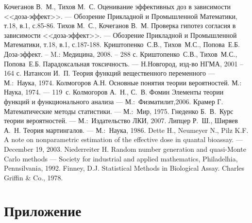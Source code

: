 \documentclass[a4paper,14pt,russian]{article}
\begin{document}
\begin{thebibliography}{99}
  Кочеганов В.~М., Тихов М.~С. Оценивание эффективных доз в зависимости <<доза-эффект>>. --- Обозрение Прикладной и Промышленной Математики, т.18, в.1, с.85-86.
  Тихов М.~С., Кочеганов В.~М. Проверка гипотез согласия в зависимости <<доза-эффект>>. ---  Обозрение Прикладной и Промышленной Математики, т.18, в.1, с.187-188.
 Криштопенко~С.В., Тихов~М.С., Попова~Е.Б. Доза-эффект.
-- M.: Медицина, 2008. -- 288 с.
 Криштопенко~С.В., Тихов~М.С., Попова~Е.Б. Парадоксальная токсичность. –-- Н.Новгород, изд-во НГМА, 2001 – 164 с.
 Натансон И.~П. Теория функций вещественного переменного --- М.:~Наука, 1974.
 Колмогоров А.Н. Основные понятия теории
  вероятностей. М.: Наука, 1974. --- 119~с.
 Колмогоров А.~Н., С.~В. Фомин Элементы теории функций и функционального анализа --- М.:~Физматилит,2006.
 Крамер Г. Математические методы статистики. --- М.:~Мир, 1975.
 Гнеденко Б.~В.\ Курс теории вероятностей. --- М.:~Издательство ЛКИ, 2007.
 Липцер Р.~Ш., Ширяев А.~Н. Теория мартингалов. --- М.:~Наука, 1986.
 Dette H., Neumeyer N., Pilz K.F. A note on nonparametric estimation of the effective dose in quantal bioassay. --- December 19, 2003.
 Niederreiter H. Random number generation and quasi-Monte Carlo methods --- Society for industrial and applied mathematics, Philadelhia, Pennsilvania, 1992.
 Finney, D.J. Statistical Methods in Biological Assay. Charles Griffin \& Co., 1978.




\end{thebibliography}
\newpage
\appendix
{}
\section*{Приложение}
\end{document}
